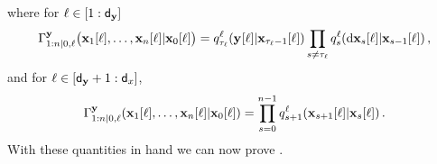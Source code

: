     where for $\ell \in [1:{\mathsf{d}_{\mathbf{y}}}]$
\begin{equation}
    \label{eq:joint_noiseless:forward_observed}
    \Gamma^{\diffltrmeas} _{1:n|0, \ell}\big(\vecidx{\ltrstate}{1}{\ell}, \dotsc, \vecidx{\ltrstate}{n}{\ell} | \vecidx{\ltrstate}{0}{\ell} \big) = \idxfwtrans{\tau_\ell}{\vecidx{\ltrstate}{\tau_{\ell} - 1}{\ell}}{\vecidx{\diffltrmeas}{}{\ell}}{\ell}  \prod_{s \neq \tau_\ell}  \idxfwtrans{s}{\vecidx{\ltrstate}{s-1}{\ell}}{\rmd \vecidx{\ltrstate}{s}{\ell}}{\ell}  \eqsp,
\end{equation} 
and for $\ell \in [{\mathsf{d}_{\mathbf{y}}}+1:{\mathsf{d}_x}]$,
\begin{equation}
    \label{eq:joint_noiseless:forward_unobserved}
    \Gamma^{\diffltrmeas} _{1:n|0, \ell}(\vecidx{\ltrstate}{1}{\ell}, \dotsc, \vecidx{\ltrstate}{n}{\ell} |\vecidx{\ltrstate}{0}{\ell}) = \prod_{s = 0}^{n-1} \idxfwtrans{s+1}{\vecidx{\ltrstate}{s}{\ell}}{\vecidx{\ltrstate}{s+1}{\ell}}{\ell} \eqsp.
\end{equation}
With these quantities in hand we can now prove .
